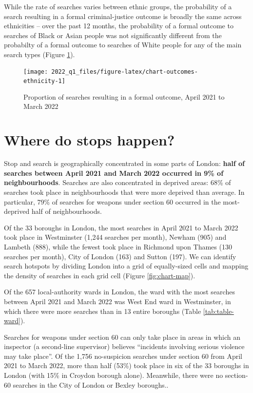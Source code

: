 \documentclass[
  a4paper,
  twoside, 11pt]{article}
\begin{document}
While the rate of searches varies between ethnic groups, the probability of a search resulting in a formal criminal-justice outcome is broadly the same across ethnicities -- over the past 12 months, the probability of a formal outcome to searches of Black or Asian people was not significantly different from the probabilty of a formal outcome to searches of White people for any of the main search types (Figure \ref{fig:chart-outcomes-ethnicity}).



\begin{figure}[tb]

{\centering \texttt{[image: 2022\_q1\_files/figure-latex/chart-outcomes-ethnicity-1]} 

}

\caption{Proportion of searches resulting in a formal outcome, April 2021 to March 2022}\label{fig:chart-outcomes-ethnicity}
\end{figure}

\hypertarget{where-do-stops-happen}{%
\section{Where do stops happen?}\label{where-do-stops-happen}}

Stop and search is geographically concentrated in some parts of London: \textbf{half of searches between April 2021 and March 2022 occurred in 9\% of neighbourhoods}. Searches are also concentrated in deprived areas: 68\% of searches took place in neighbourhoods that were more deprived than average. In particular, 79\% of searches for weapons under section 60 occurred in the most-deprived half of neighbourhoods.

Of the 33 boroughs in London, the most searches in April 2021 to March 2022 took place in Westminster (1,244 searches per month), Newham (905) and Lambeth (888), while the fewest took place in Richmond upon Thames (130 searches per month), City of London (163) and Sutton (197). We can identify search hotspots by dividing London into a grid of equally-sized cells and mapping the density of searches in each grid cell (Figure \ref{fig:chart-map}).

Of the 657 local-authority wards in London, the ward with the most searches between April 2021 and March 2022 was West End ward in Westminster, in which there were more searches than in 13 entire boroughs (Table \ref{tab:table-ward}).

Searches for weapons under section 60 can only take place in areas in which an inspector (a second-line supervisor) believes ``incidents involving serious violence may take place''. Of the 1,756 no-suspicion searches under section 60 from April 2021 to March 2022, more than half (53\%) took place in six of the 33 boroughs in London (with 15\% in Croydon borough alone). Meanwhile, there were no section-60 searches in the City of London or Bexley boroughs..
\end{document}
